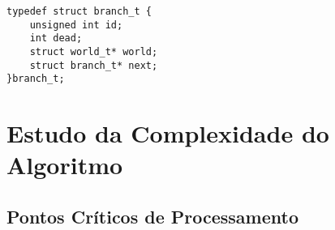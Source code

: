 \begin{lstlisting}[frame=single]
typedef struct branch_t {
    unsigned int id;
    int dead;
    struct world_t* world;
    struct branch_t* next;
}branch_t;
\end{lstlisting}

\section{Estudo da Complexidade do Algoritmo}
\label{sec:complexidade_do_algoritmo}

\subsection{Pontos Críticos de Processamento}
\label{sub:pontos_cr_ticos_de_processamento}





